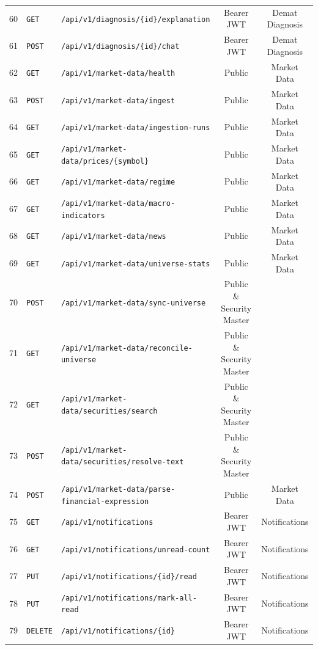 \begin{small}
\begin{xltabular}{\textwidth}{llp{7.2cm}cc}
60 & \texttt{GET} & \texttt{/api/v1/diagnosis/\{id\}/explanation} & Bearer JWT & Demat Diagnosis \\
61 & \texttt{POST} & \texttt{/api/v1/diagnosis/\{id\}/chat} & Bearer JWT & Demat Diagnosis \\
62 & \texttt{GET} & \texttt{/api/v1/market-data/health} & Public & Market Data \\
63 & \texttt{POST} & \texttt{/api/v1/market-data/ingest} & Public & Market Data \\
64 & \texttt{GET} & \texttt{/api/v1/market-data/ingestion-runs} & Public & Market Data \\
65 & \texttt{GET} & \texttt{/api/v1/market-data/prices/\{symbol\}} & Public & Market Data \\
66 & \texttt{GET} & \texttt{/api/v1/market-data/regime} & Public & Market Data \\
67 & \texttt{GET} & \texttt{/api/v1/market-data/macro-indicators} & Public & Market Data \\
68 & \texttt{GET} & \texttt{/api/v1/market-data/news} & Public & Market Data \\
69 & \texttt{GET} & \texttt{/api/v1/market-data/universe-stats} & Public & Market Data \\
70 & \texttt{POST} & \texttt{/api/v1/market-data/sync-universe} & Public \& Security Master \\
71 & \texttt{GET} & \texttt{/api/v1/market-data/reconcile-universe} & Public \& Security Master \\
72 & \texttt{GET} & \texttt{/api/v1/market-data/securities/search} & Public \& Security Master \\
73 & \texttt{POST} & \texttt{/api/v1/market-data/securities/resolve-text} & Public \& Security Master \\
74 & \texttt{POST} & \texttt{/api/v1/market-data/parse-financial-expression} & Public & Market Data \\
75 & \texttt{GET} & \texttt{/api/v1/notifications} & Bearer JWT & Notifications \\
76 & \texttt{GET} & \texttt{/api/v1/notifications/unread-count} & Bearer JWT & Notifications \\
77 & \texttt{PUT} & \texttt{/api/v1/notifications/\{id\}/read} & Bearer JWT & Notifications \\
78 & \texttt{PUT} & \texttt{/api/v1/notifications/mark-all-read} & Bearer JWT & Notifications \\
79 & \texttt{DELETE} & \texttt{/api/v1/notifications/\{id\}} & Bearer JWT & Notifications \\

\end{xltabular}
\end{small}
